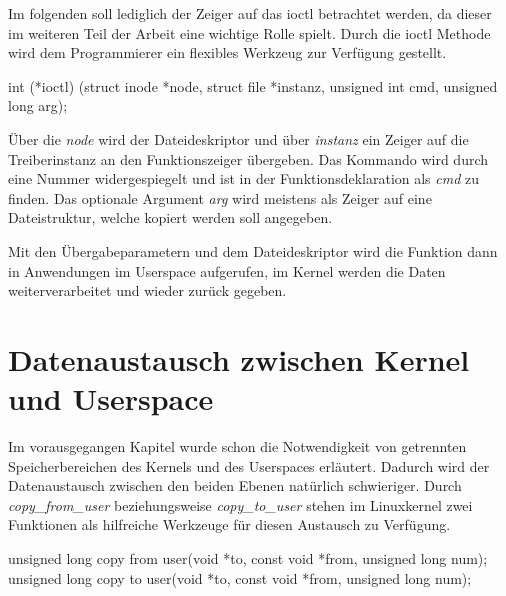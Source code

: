 Im folgenden soll lediglich der Zeiger auf das \acf{ioctl} betrachtet werden, da dieser im weiteren Teil der Arbeit eine wichtige Rolle spielt.
Durch die \ac{ioctl} Methode wird dem Programmierer ein flexibles Werkzeug zur Verfügung gestellt. 

\begin{minipage}{\textwidth}
\begin{bash}
int (*ioctl) (struct inode *node, struct file *instanz, unsigned int cmd, unsigned long arg);
\end{bash}
\end{minipage}

Über die \textit{node} wird der Dateideskriptor und über \textit{instanz} ein Zeiger auf die Treiberinstanz an den Funktionszeiger übergeben. Das Kommando wird durch eine Nummer widergespiegelt und ist in der Funktionsdeklaration als \textit{cmd} zu finden. Das optionale Argument \textit{arg} wird meistens als Zeiger auf eine Dateistruktur, welche kopiert werden soll angegeben. \citep[S. 90f]{corbet2005linux}

Mit den Übergabeparametern und dem Dateideskriptor wird die Funktion dann in Anwendungen im Userspace aufgerufen, im Kernel werden die Daten weiterverarbeitet und wieder zurück gegeben.

\section{Datenaustausch zwischen Kernel und Userspace}
Im vorausgegangen Kapitel wurde schon die Notwendigkeit von getrennten Speicherbereichen des Kernels und des Userspaces erläutert. 
Dadurch wird der Datenaustausch zwischen den beiden Ebenen natürlich schwieriger. Durch \textit{copy\_from\_user} beziehungsweise \textit{copy\_to\_user} stehen im Linuxkernel zwei Funktionen als hilfreiche Werkzeuge für diesen Austausch zu Verfügung.

\begin{minipage}{\textwidth}
\begin{bash}
unsigned long copy from user(void *to, const void *from, unsigned long num);
unsigned long copy to user(void *to, const void *from, unsigned long num);
\end{bash}
\end{minipage}

